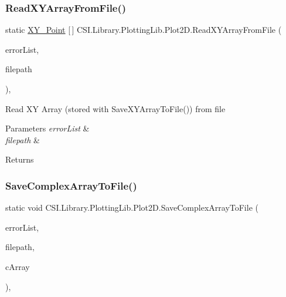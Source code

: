 \subsubsection{\texorpdfstring{ReadXYArrayFromFile()}{ReadXYArrayFromFile()}}
{\footnotesize\ttfamily static \mbox{\hyperlink{struct_c_s_i_1_1_library_1_1_data_types_1_1_x_y___point}{X\+Y\+\_\+\+Point}} \mbox{[}$\,$\mbox{]} C\+S\+I.\+Library.\+Plotting\+Lib.\+Plot2\+D.\+Read\+X\+Y\+Array\+From\+File (\begin{DoxyParamCaption}\item[{\mbox{\hyperlink{class_c_s_i_1_1_library_1_1_errors_1_1_error_list}{Error\+List}}}]{error\+List,  }\item[{string}]{filepath }\end{DoxyParamCaption})\hspace{0.3cm}{\ttfamily [inline]}, {\ttfamily [static]}}



Read XY Array (stored with Save\+X\+Y\+Array\+To\+File()) from file 


\begin{DoxyParams}{Parameters}
{\em error\+List} & \\
\hline
{\em filepath} & \\
\hline
\end{DoxyParams}
\begin{DoxyReturn}{Returns}

\end{DoxyReturn}
\mbox{\label{class_c_s_i_1_1_library_1_1_plotting_lib_1_1_plot2_d_a0959acd193403a2feaaad7940884ad12}} 
\subsubsection{\texorpdfstring{SaveComplexArrayToFile()}{SaveComplexArrayToFile()}}
{\footnotesize\ttfamily static void C\+S\+I.\+Library.\+Plotting\+Lib.\+Plot2\+D.\+Save\+Complex\+Array\+To\+File (\begin{DoxyParamCaption}\item[{\mbox{\hyperlink{class_c_s_i_1_1_library_1_1_errors_1_1_error_list}{Error\+List}}}]{error\+List,  }\item[{string}]{filepath,  }\item[{\mbox{\hyperlink{struct_c_s_i_1_1_library_1_1_data_types_1_1_complex}{Complex}} \mbox{[}$\,$\mbox{]}}]{c\+Array }\end{DoxyParamCaption})\hspace{0.3cm}{\ttfamily [inline]}, {\ttfamily [static]}}



